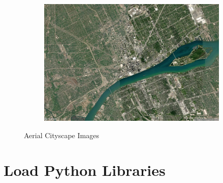 \documentclass[
  letterpaper,
  DIV=11,
  numbers=noendperiod]{scrreprt}
\begin{document}
\begin{figure}
\begin{minipage}{0.33\linewidth}
\begin{figure}[H]
{}


\end{figure}%

\end{minipage}%
%
\begin{minipage}{0.33\linewidth}

\begin{figure}[H]

{\centering \includegraphics{images/detroit_zoom_12.png}

}


\end{figure}%

\end{minipage}%

\caption{\label{fig-city-images}Aerial Cityscape Images}

\end{figure}%

\section{Load Python Libraries}\label{load-python-libraries}
\end{document}
